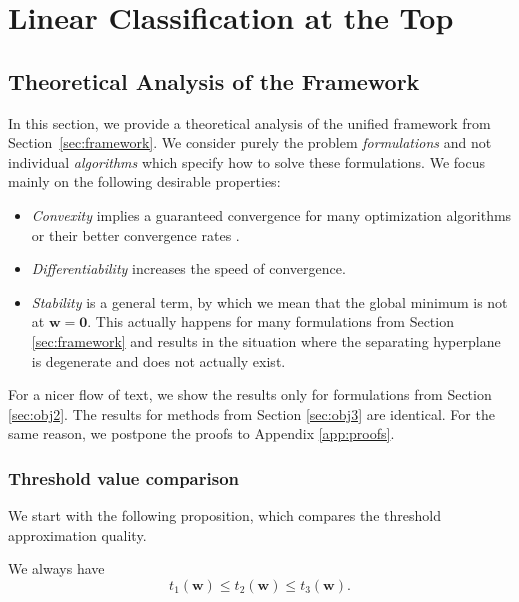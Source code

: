 \chapter{Linear Classification at the Top}

\section{Theoretical Analysis of the Framework}\label{sec:theory}

In this section, we provide a theoretical analysis of the unified framework from Section~\ref{sec:framework}. We consider purely the problem \textit{formulations} and not individual \textit{algorithms} which specify how to solve these formulations. We focus mainly on the following desirable properties:
\begin{itemize}
  \item \textit{Convexity} implies a guaranteed convergence for many optimization algorithms or their better convergence rates \cite{boyd2004convex}.
  \item \textit{Differentiability} increases the speed of convergence.
  \item \textit{Stability} is a general term, by which we mean that the global minimum is not at $\bm{w} = \bm{0}$. This actually happens for many formulations from Section \ref{sec:framework} and results in the situation where the separating hyperplane is degenerate and does not actually exist.
\end{itemize}
For a nicer flow of text, we show the results only for formulations from Section \ref{sec:obj2}. The results for methods from Section \ref{sec:obj3} are identical. For the same reason, we postpone the proofs to Appendix \ref{app:proofs}.

\subsection{Threshold value comparison}

We start with the following proposition, which compares the threshold approximation quality.

\begin{proposition}\label{prop:threholds}
  We always have
  \begin{equation*}
    t_1(\bm{w}) \le t_2(\bm{w}) \le t_3(\bm{w}).
  \end{equation*}
\end{proposition}

